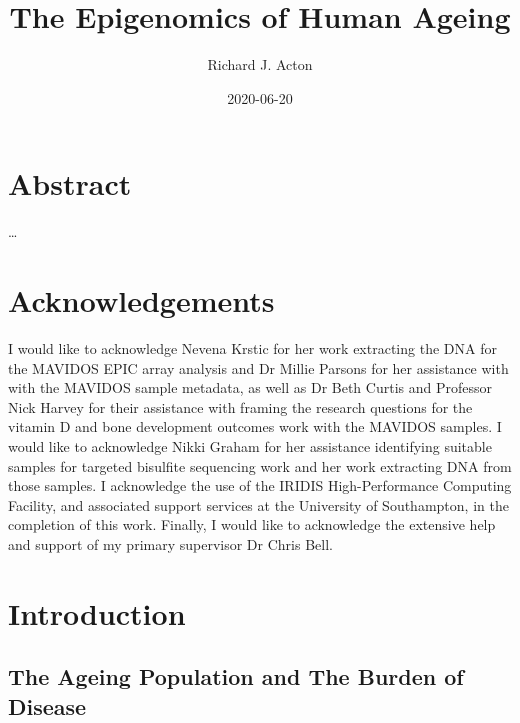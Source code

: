 \documentclass[
]{book}
\title{The Epigenomics of Human Ageing}
\subtitle{The Epigenomics of Human Ageing

Academic Unit - Human Development and Health

Supervisors - Chris Bell, Karen Lillycrop and Cyrus Cooper}
\author{Richard J. Acton}
\date{2020-06-20}
\begin{document}
\maketitle

{
\hypersetup{linkcolor=}
\setcounter{tocdepth}{1}
\tableofcontents
}
\hypertarget{abstract}{%
\chapter*{Abstract}\label{abstract}}

\ldots{}

\hypertarget{acknowledgements}{%
\chapter*{Acknowledgements}\label{acknowledgements}}

I would like to acknowledge Nevena Krstic for her work extracting the DNA for the MAVIDOS EPIC array analysis and Dr Millie Parsons for her assistance with with the MAVIDOS sample metadata, as well as Dr Beth Curtis and Professor Nick Harvey for their assistance with framing the research questions for the vitamin D and bone development outcomes work with the MAVIDOS samples. I would like to acknowledge Nikki Graham for her assistance identifying suitable samples for targeted bisulfite sequencing work and her work extracting DNA from those samples. I acknowledge the use of the IRIDIS High-Performance Computing Facility, and associated support services at the University of Southampton, in the completion of this work. Finally, I would like to acknowledge the extensive help and support of my primary supervisor Dr Chris Bell.

\hypertarget{introduction}{%
\chapter{Introduction}\label{introduction}}

\hypertarget{the-ageing-population-and-the-burden-of-disease}{%
\section{The Ageing Population and The Burden of Disease}\label{the-ageing-population-and-the-burden-of-disease}}
\end{document}
